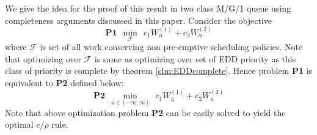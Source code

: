 \documentclass[letterpaper, 10 pt, conference]{ieeeconf}  %
\begin{document}
We give the idea for the proof of this result in two class M/G/1 queue using completeness arguments discussed in this paper. Consider the objective 
$$\mathbf{P1}~~\min_{\mathcal{F}}~~c_1W_{\alpha}^{(1)}+c_2W_{\alpha}^{(2)}$$
where $\mathcal{F}$ is set of all work conserving non pre-emptive scheduling  policies. Note that optimizing over $\mathcal{F}$ is same as optimizing over  
set of EDD priority as this class of priority is complete by theorem \ref{clm:EDDcomplete}. Hence problem \textbf{P1} is equivalent to \textbf{P2} defined below:
 $$\mathbf{P2}~~\min_{ \bar{u}\in [-\infty, \infty] }~~c_1W_{\bar{u}}^{(1)}+c_2 W_{\bar{u}}^{(2)} $$
 Note that above optimization problem \textbf{P2} can be easily solved to yield the optimal $c/\rho$ rule.
\end{document}
